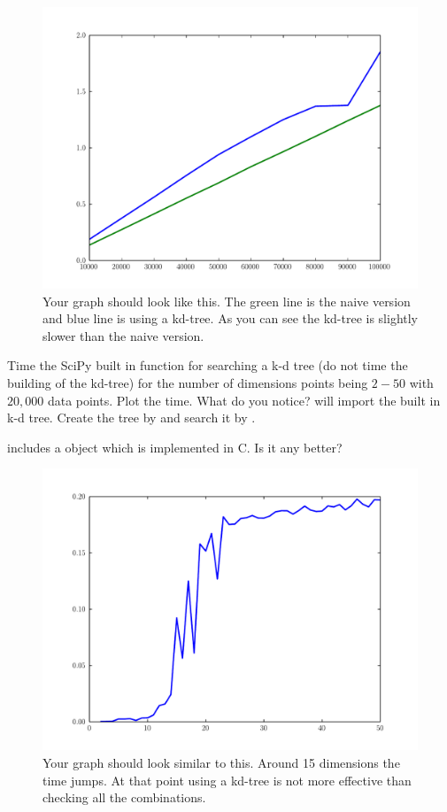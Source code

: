 \begin{figure}[H]
\includegraphics[width=\textwidth]{twentyDTime.pdf}
\caption{
Your graph should look like this.
The green line is the naive version and blue line is using a kd-tree.
As you can see the kd-tree is slightly slower than the naive version.}
\label{fig:twentyDTime}
\end{figure}

\begin{problem}
Time the SciPy built in function for searching a k-d tree (do not time the building of the kd-tree) for the number of dimensions points being $2-50$ with $20,000$ data points.
Plot the time.
What do you notice?
 will import the built in k-d tree.
Create the tree by  and search it by .

 includes a  object which is implemented in C.
Is it any better?

\begin{figure}[H]
\includegraphics[width=\textwidth]{curseD.pdf}
\caption{
Your graph should look similar to this.
Around 15 dimensions the time jumps.
At that point using a kd-tree is not more effective than checking all the combinations.}
\end{figure}
\end{problem}

